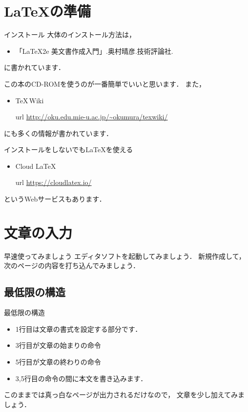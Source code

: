 \documentclass[slide,dvipdfmx]{beamer}
\begin{document}
\section{\LaTeX の準備}
\begin{frame}{インストール}
大体のインストール方法は，
\begin{itemize}
\item 「\LaTeX2e 美文書作成入門」.奥村晴彦.技術評論社.
\end{itemize}
に書かれています．

この本のCD-ROMを使うのが一番簡単でいいと思います．
また，
\begin{itemize}
\item \TeX \,Wiki
\item[url] \url{http://oku.edu.mie-u.ac.jp/~okumura/texwiki/}
\end{itemize}
にも多くの情報が書かれています．

インストールをしないでも\LaTeX を使える
\begin{itemize}
\item Cloud \LaTeX
\item[url] \url{https://cloudlatex.io/}
\end{itemize}
というWebサービスもあります．
\end{frame}

\section{文章の入力}
\begin{frame}{早速使ってみましょう}
エディタソフトを起動してみましょう．
新規作成して，次のページの内容を打ち込んでみましょう．
\end{frame}

\subsection*{最低限の構造}
\begin{frame}{最低限の構造}

\begin{itemize}
\item 1行目は文章の書式を設定する部分です．
\item 3行目が文章の始まりの命令
\item 5行目が文章の終わりの命令
\item 3,5行目の命令の間に本文を書き込みます．
\end{itemize}
このままでは真っ白なページが出力されるだけなので，
文章を少し加えてみましょう．
\end{frame}
\end{document}
